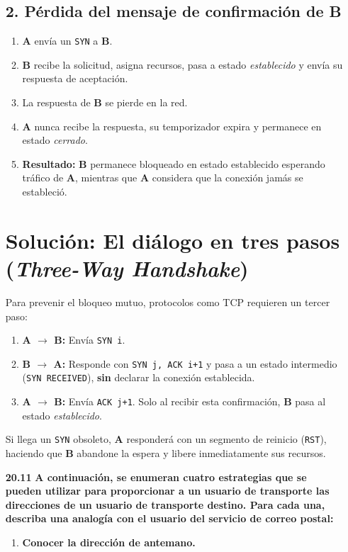 \documentclass[11pt,a4paper]{article}
\begin{document}
\begin{enumerate}
\subsection*{2. Pérdida del mensaje de confirmación de B}
\begin{enumerate}
    \item \textbf{A} envía un \texttt{SYN} a \textbf{B}.
    \item \textbf{B} recibe la solicitud, asigna recursos, pasa a estado \textit{establecido} y envía su respuesta de aceptación.
    \item La respuesta de \textbf{B} se pierde en la red.
    \item \textbf{A} nunca recibe la respuesta, su temporizador expira y permanece en estado \textit{cerrado}.
    \item \textbf{Resultado:} \textbf{B} permanece bloqueado en estado establecido esperando tráfico de \textbf{A}, mientras que \textbf{A} considera que la conexión jamás se estableció.
\end{enumerate}

\section*{Solución: El diálogo en tres pasos (\textit{Three-Way Handshake})}

Para prevenir el bloqueo mutuo, protocolos como TCP requieren un tercer paso:
\begin{enumerate}
    \item \textbf{A $\rightarrow$ B:} Envía \texttt{SYN i}.
    \item \textbf{B $\rightarrow$ A:} Responde con \texttt{SYN j, ACK i+1} y pasa a un estado intermedio (\texttt{SYN RECEIVED}), \textbf{sin} declarar la conexión establecida.
    \item \textbf{A $\rightarrow$ B:} Envía \texttt{ACK j+1}. Solo al recibir esta confirmación, \textbf{B} pasa al estado \textit{establecido}.
\end{enumerate}

Si llega un \texttt{SYN} obsoleto, \textbf{A} responderá con un segmento de reinicio (\texttt{RST}), haciendo que \textbf{B} abandone la espera y libere inmediatamente sus recursos.

    \item[\textbf{20.11}] \textbf{A continuación, se enumeran cuatro estrategias que se pueden utilizar para proporcionar a un usuario de transporte las direcciones de un usuario de transporte destino. Para cada una, describa una analogía con el usuario del servicio de correo postal:}
    \begin{enumerate}[label=\alph*)]
        \item \textbf{Conocer la dirección de antemano.}


\end{enumerate}
\end{enumerate}
\end{document}
